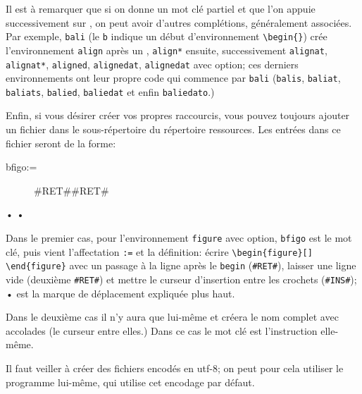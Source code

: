 Il est à remarquer que si on donne un mot clé partiel et que l'on appuie successivement sur , on peut avoir d'autres complétions, généralement associées. Par exemple, \verb|bali| (le \verb|b| indique un début d'environnement \verb|\begin{}|) crée l'environnement \verb|align| après un , \verb|align*|	ensuite, successivement \verb|alignat|, \verb|alignat*|, \verb|aligned|, \verb|alignedat|, \verb|alignedat| avec option; ces derniers environnements ont leur propre code qui commence par \verb|bali| (\verb|balis|, \verb|baliat|, \verb|baliats|, \verb|balied|, \verb|baliedat| et enfin \verb|baliedato|.)

Enfin, si vous désirer créer vos propres raccourcis, vous pouvez toujours ajouter un fichier  dans le sous-répertoire  du répertoire ressources. 
Les entrées dans ce fichier seront de la forme:
\begin{verbExample}
bfigo:=\begin{figure}[#INS#]#RET##RET#\end{figure}•
•
\end{verbExample}

Dans le premier cas, pour l'environnement \verb|figure| avec option, \verb|bfigo| est le mot clé, puis vient l'affectation \verb|:=| et la définition: écrire \verb|\begin{figure}[]| \verb|\end{figure}| avec un passage à la ligne après le \verb|begin| (\verb|#RET#|), laisser une ligne vide (deuxième \verb|#RET#|) et mettre le curseur d'insertion entre les crochets (\verb|#INS#|); \og•\fg{} est la marque de déplacement expliquée plus haut.

Dans le deuxième cas il n'y aura que \verb|| lui-même et \Tw{} créera le nom complet avec accolades (le curseur entre elles.) Dans ce cas le mot clé est l'instruction elle-même.


Il faut veiller à créer des fichiers  encodés en utf-8; on peut pour cela utiliser le programme \Tw{} lui-même, qui utilise cet encodage par défaut.

